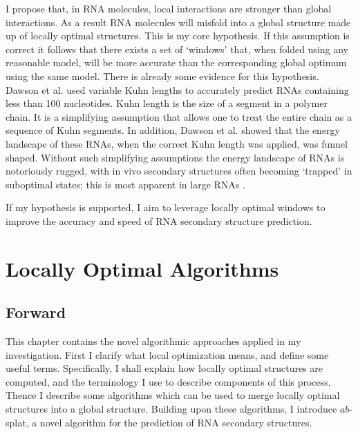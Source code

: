 \documentclass{cshonours}
\begin{document}
I propose that, in RNA molecules, local interactions are stronger than global interactions. As a result RNA molecules will misfold into a global structure made up of locally optimal structures. This is my core hypothesis. If this assumption is correct it follows that there exists a set of `windows' that, when folded using any reasonable model, will be more accurate than the corresponding global optimum using the same model. There is already some evidence for this hypothesis. Dawson et al. \cite{dawson2013new} used variable Kuhn lengths to accurately predict RNAs containing less than 100 nucleotides. Kuhn length is the size of a segment in a polymer chain. It is a simplifying assumption that allows one to treat the entire chain as a sequence of Kuhn segments. In addition, Dawson et al. showed that the energy landscape of these RNAs, when the correct Kuhn length was applied, was funnel shaped. Without such simplifying assumptions the energy landscape of RNAs is notoriously rugged, with in vivo secondary structures often becoming `trapped' in suboptimal states; this is most apparent in large RNAs \cite{ditzler2008rugged}.

If my hypothesis is supported, I aim to leverage locally optimal windows to improve the accuracy and speed of RNA secondary structure prediction.

\chapter{Locally Optimal Algorithms}

\section{Forward}
This chapter contains the novel algorithmic approaches applied in my investigation. First I clarify what local optimization means, and define some useful terms. Specifically, I shall explain how locally optimal structures are computed, and the terminology I use to describe components of this process. Thence I describe some algorithms which can be used to merge locally optimal structures into a global structure. Building upon these algorithms, I introduce $ab$-splat, a novel algorithm for the prediction of RNA secondary structures.
\end{document}

